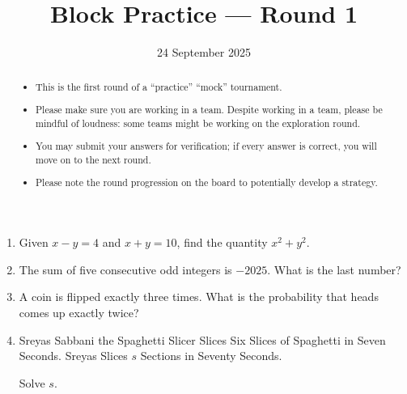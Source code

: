 \documentclass{tufte-handout}
\title{Block Practice — Round 1}
\author[IA Math Team]{}
\date{24 September 2025}
\begin{document}
\maketitle

\begin{abstract}
\begin{itemize}
\item This is the first round of a ``practice'' ``mock'' tournament.
\item Please make sure you are working in a team. Despite working in a team, please be mindful of loudness: some teams might be working on the exploration round.
\item You may submit your answers for verification; if every answer is correct, you will move on to the next round.
\item Please note the round progression on the board to potentially develop a strategy.
\end{itemize}
\end{abstract}

\vspace{1.5em}

\begin{enumerate}
    \setlength{\itemsep}{10em}
    \item Given $x-y=4$ and $x+y=10$, find the quantity $x^2+y^2$.
    \item The sum of five consecutive odd integers is $-2025$. What is the last number?
    \item A coin is flipped exactly three times. What is the probability that heads comes up exactly twice?
    \item Sreyas Sabbani the Spaghetti Slicer Slices Six Slices of Spaghetti in Seven Seconds. Sreyas Slices $s$ Sections in Seventy Seconds.
    
    Solve $s$.

    
\end{enumerate}
\end{document}
